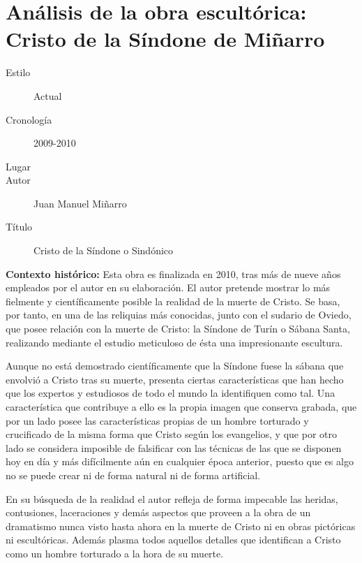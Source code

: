 \section{Análisis de la obra escultórica: Cristo de la Síndone de Miñarro} 


\newpage

\begin{description}
\item[Estilo] Actual
\item[Cronología] 2009-2010
\item[Lugar] 
\item[Autor] Juan Manuel Miñarro
\item[Título] Cristo de la Síndone o Sindónico
\end{description}

\textbf{Contexto histórico:} Esta obra es finalizada en 2010, tras más de nueve años empleados por el autor en su elaboración. El autor pretende mostrar lo más fielmente y científicamente posible la realidad de la muerte de Cristo. Se basa, por tanto, en una de las reliquias más conocidas, junto con el sudario de Oviedo, que posee relación con la muerte de Cristo: la Síndone de Turín o Sábana Santa, realizando mediante el estudio meticuloso de ésta una impresionante escultura.

Aunque no está demostrado científicamente que la Síndone fuese la sábana que envolvió a Cristo tras su muerte, presenta ciertas características que han hecho que los expertos y estudiosos de todo el mundo la identifiquen como tal. Una característica que contribuye a ello es la propia imagen que conserva grabada, que por un lado posee las características propias de un hombre torturado y crucificado de la misma forma que Cristo según los evangelios, y que por otro lado se considera imposible de falsificar con las técnicas de las que se disponen hoy en día y más difícilmente aún en cualquier época anterior, puesto que es algo no se puede crear ni de forma natural ni de forma artificial.

En su búsqueda de la realidad el autor refleja de forma impecable las heridas, contusiones, laceraciones y demás aspectos que proveen a la obra de un dramatismo nunca visto hasta ahora en la muerte de Cristo ni en obras pictóricas ni escultóricas. Además plasma todos aquellos detalles que identifican a Cristo como un hombre torturado a la hora de su muerte.

